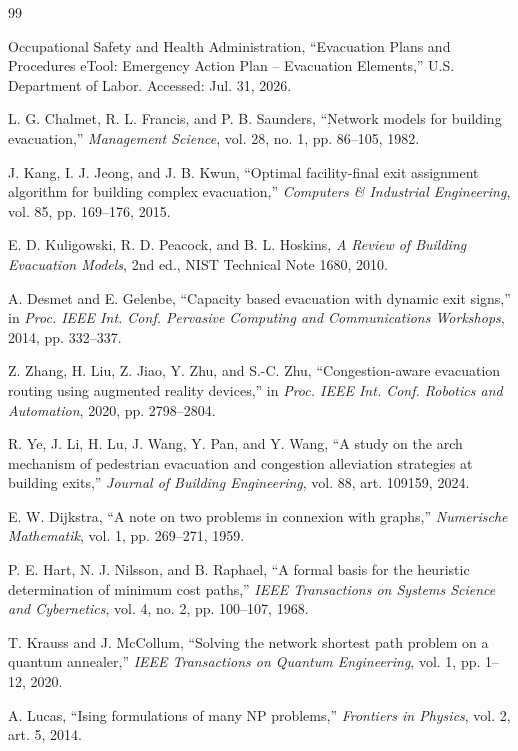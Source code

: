 \documentclass[11pt]{article}
\begin{document}
\begin{thebibliography}{99}

 Occupational Safety and Health Administration, ``Evacuation Plans and Procedures eTool: Emergency Action Plan -- Evacuation Elements,'' U.S. Department of Labor. Accessed: Jul. 31, 2026.

 L. G. Chalmet, R. L. Francis, and P. B. Saunders, ``Network models for building evacuation,'' \textit{Management Science}, vol. 28, no. 1, pp. 86--105, 1982.

 J. Kang, I. J. Jeong, and J. B. Kwun, ``Optimal facility-final exit assignment algorithm for building complex evacuation,'' \textit{Computers \& Industrial Engineering}, vol. 85, pp. 169--176, 2015.

 E. D. Kuligowski, R. D. Peacock, and B. L. Hoskins, \textit{A Review of Building Evacuation Models}, 2nd ed., NIST Technical Note 1680, 2010.

 A. Desmet and E. Gelenbe, ``Capacity based evacuation with dynamic exit signs,'' in \textit{Proc. IEEE Int. Conf. Pervasive Computing and Communications Workshops}, 2014, pp. 332--337.

 Z. Zhang, H. Liu, Z. Jiao, Y. Zhu, and S.-C. Zhu, ``Congestion-aware evacuation routing using augmented reality devices,'' in \textit{Proc. IEEE Int. Conf. Robotics and Automation}, 2020, pp. 2798--2804.

 R. Ye, J. Li, H. Lu, J. Wang, Y. Pan, and Y. Wang, ``A study on the arch mechanism of pedestrian evacuation and congestion alleviation strategies at building exits,'' \textit{Journal of Building Engineering}, vol. 88, art. 109159, 2024.

 E. W. Dijkstra, ``A note on two problems in connexion with graphs,'' \textit{Numerische Mathematik}, vol. 1, pp. 269--271, 1959.

 P. E. Hart, N. J. Nilsson, and B. Raphael, ``A formal basis for the heuristic determination of minimum cost paths,'' \textit{IEEE Transactions on Systems Science and Cybernetics}, vol. 4, no. 2, pp. 100--107, 1968.

 T. Krauss and J. McCollum, ``Solving the network shortest path problem on a quantum annealer,'' \textit{IEEE Transactions on Quantum Engineering}, vol. 1, pp. 1--12, 2020.

 A. Lucas, ``Ising formulations of many NP problems,'' \textit{Frontiers in Physics}, vol. 2, art. 5, 2014.


\end{thebibliography}
\end{document}
